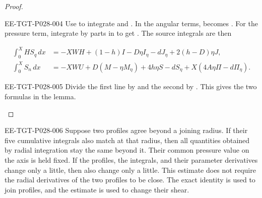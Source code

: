 \begin{proof}
\begin{EESegment}{EE-TGT-P028-004}
Use  to integrate
 and
. In the angular terms,
 becomes
. For the pressure term, integrate by parts
in  to get
. The source
integrals are then
\end{EESegment}
\[
\begin{aligned}
 \int_0^XHS_q\,dx
   &=-XWH+(1-h)I-D\eta I_\eta-dJ_\eta+2(h-D)\eta J,\\
 \int_0^XS_n\,dx
   &=-XWU+D(M-\eta M_\eta)+4h\eta S-dS_\eta
      +X(4A\eta\Pi-d\Pi_\eta).
\end{aligned}
\]
\begin{EESegment}{EE-TGT-P028-005}
Divide the first line by  and the second by
. This gives the two formulas in the lemma.
\end{EESegment}
\end{proof}

\begin{EESegment}{EE-TGT-P028-006}
Suppose two profiles agree beyond a joining radius. If their five cumulative
integrals also match at that radius, then all quantities obtained by radial
integration stay the same beyond it. Their common pressure value on the axis
is held fixed. If the profiles, the integrals, and their parameter
derivatives change only a little, then
 also change only a little. This estimate
does not require the radial derivatives of the two profiles to be close. The
exact identity is used to join profiles, and the estimate is used to change
their shear.
\end{EESegment}

